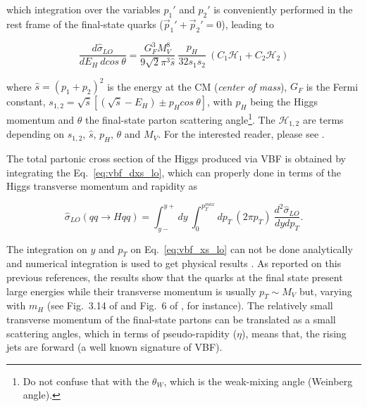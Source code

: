 which integration over the variables $p_{1}'$ and $p_{2}'$ is conveniently performed in the rest frame of the final-state quarks ($\vec{p}_{1}' + \vec{p}_{2}' = 0$), leading to \cite{bib:PhysRep457-1-2005}

\begin{equation}
\frac{d\hat{\sigma}_{LO}}{dE_{H}~dcos~\theta} = \frac{G_{F}^{3}M_{V}^{8}}{9\sqrt{2}\pi^{3}\hat{s}}~\frac{p_{H}}{32s_{1}s_{2}}~(C_{1}\mathcal{H}_{1} + C_{2}\mathcal{H}_{2})
\label{eq:vbf_dxs_lo}
\end{equation}

where $\hat{s} = (p_{1}+p_{2})^{2}$ is the energy at the CM (\textit{center of mass}), $G_{F}$ is the Fermi constant, $s_{1,2} = \sqrt{\hat{s}}[(\sqrt{\hat{s}}-E_{H}) \pm p_{H}cos~\theta]$, with $p_{H}$ being the Higgs momentum and $\theta$ the final-state parton scattering angle\footnote{Do not confuse that with the $\theta_{W}$, which is the weak-mixing angle (Weinberg angle).}. The $\mathcal{H}_{1,2}$ are terms depending on $s_{1,2}$, $\hat{s}$, $p_{H}$, $\theta$ and $M_{V}$. For the interested reader, please see \cite{bib:PhysRep457-1-2005}.

The total partonic cross section of the Higgs produced via VBF is obtained by integrating the Eq.~\ref{eq:vbf_dxs_lo}, which can properly done in terms of the Higgs transverse momentum and rapidity as

\begin{equation}
\hat{\sigma}_{LO}(qq \rightarrow Hqq) = \int_{y-}^{y+}dy~\int_{0}^{p_{T}^{max}}dp_{T}~(2\pi p_{T})~\frac{d^{2}\hat{\sigma}_{LO}}{dydp_{T}}.
\label{eq:vbf_xs_lo}
\end{equation}

The integration on $y$ and $p_{T}$ on Eq.~\ref{eq:vbf_xs_lo} can not be done analytically and numerical integration is used to get physical results \cite{bib:PhysRep457-1-2005,bib:NuclPhysB287-1987}. As reported on this previous references, the results show that the quarks at the final state present large energies while their transverse momentum is usually $p_{T} \sim M_{V}$ but, varying with $m_{H}$ (see Fig.~3.14 of \cite{bib:PhysRep457-1-2005} and Fig.~6 of \cite{bib:NuclPhysB287-1987}, for instance). The relatively small transverse momentum of the final-state partons can be translated as a small scattering angles, which in terms of pseudo-rapidity ($\eta$), means that, the rising jets are forward (a well known signature of VBF).


